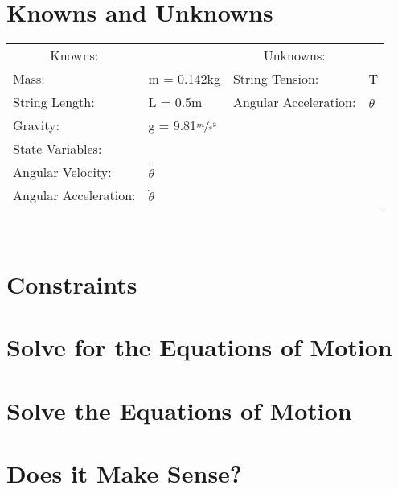 \documentclass[12pt]{report}
\begin{document}
\begin{flushleft}
\section{Knowns and Unknowns} \label{knownsandunknowns}
\begin{tabular}{ll@{\hskip .75in}ll}
  \multicolumn{1}{c}{Knowns:} && \multicolumn{1}{c}{Unknowns:} \\
  Mass: &m = 0.142kg & String Tension: & T \\
  String Length: &L = 0.5m & Angular Acceleration: & $\ddot{\theta}$ \\
  Gravity: &g = 9.81$\sfrac{m}{s^2}$ \\
  State Variables: \\
  \quad Angular Velocity: &$\dot{\theta}$ & \\
  \quad Angular Acceleration:&$\ddot{\theta}$ & \\
\end{tabular}
\vspace{2ex}
\\

\section{Constraints}

\section{Solve for the Equations of Motion}

\section{Solve the Equations of Motion}

\section{Does it Make Sense?}

\end{flushleft}
\end{document}
